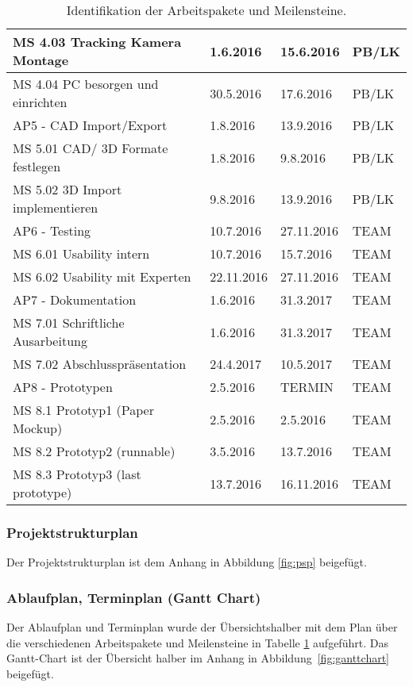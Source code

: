 \begin{table}
\begin{tabular}{|l|l|l|l|}
		\hline
		MS 4.03 Tracking Kamera Montage	& 1.6.2016 & 15.6.2016 & PB/LK\\
		\hline
		MS 4.04 PC besorgen und einrichten & 30.5.2016 & 17.6.2016 & PB/LK\\
		\hline
		AP5 - CAD Import/Export & 1.8.2016 & 13.9.2016 & PB/LK\\
		\hline
		MS 5.01 CAD/ 3D Formate festlegen & 1.8.2016 & 9.8.2016 & PB/LK\\
		\hline
		MS 5.02 3D Import implementieren & 9.8.2016 & 13.9.2016 & PB/LK\\
		\hline
		AP6 - Testing & 10.7.2016 & 27.11.2016 & TEAM\\
 		\hline
		MS 6.01 Usability intern & 10.7.2016 & 15.7.2016 & TEAM\\
 		\hline
		MS 6.02 Usability mit Experten &22.11.2016 & 27.11.2016 &TEAM\\
 		\hline
		AP7 - Dokumentation &1.6.2016 & 31.3.2017 & TEAM\\
 		\hline
		MS 7.01 Schriftliche Ausarbeitung & 1.6.2016 & 31.3.2017 & TEAM\\
 		\hline
		MS 7.02 Abschlusspräsentation & 24.4.2017 & 10.5.2017 & TEAM\\
 		\hline
		AP8 - Prototypen & 2.5.2016 & TERMIN & TEAM\\
 		\hline
		MS 8.1 Prototyp1 (Paper Mockup) & 2.5.2016 & 2.5.2016 & TEAM\\
 		\hline
		MS 8.2 Prototyp2 (runnable) & 3.5.2016 & 13.7.2016 & TEAM\\
 		\hline
		MS 8.3 Prototyp3 (last prototype) & 13.7.2016 & 16.11.2016 & TEAM\\
 		\hline
				
	\end{tabular}
	\caption[Identifikation der Arbeitspakete und Meilensteine]{Identifikation der Arbeitspakete und Meilensteine.}
	\label{tab:APMS}
\end{table}

\subsubsection{Projektstrukturplan}
Der Projektstrukturplan ist dem Anhang in Abbildung \ref{fig:psp} beigefügt.


\subsubsection{Ablaufplan, Terminplan (Gantt Chart)}
Der Ablaufplan und Terminplan wurde der Übersichtshalber mit dem Plan über die verschiedenen Arbeitspakete und Meilensteine in Tabelle \ref{tab:APMS} aufgeführt. Das Gantt-Chart ist der Übersicht halber im Anhang in Abbildung~\ref{fig:ganttchart} beigefügt.
